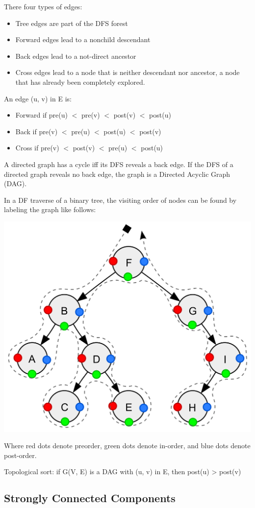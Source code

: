\begin{definition}
There four types of edges:
\begin{itemize}
	\item Tree edges are part of the DFS forest
	\item Forward edges lead to a nonchild descendant
	\item Back edges lead to a not-direct ancestor
	\item Cross edges lead to a node that is neither descendant nor ancestor, a node that has already been completely explored.
\end{itemize}
An edge (u, v) in E is:
\begin{itemize}
	\item Forward if pre(u) $<$ pre(v) $<$ post(v) $<$ post(u)
	\item Back if pre(v) $<$ pre(u) $<$ post(u) $<$ post(v)
	\item Cross if pre(v) $<$ post(v) $<$ pre(u) $<$ post(u)
\end{itemize}
\end{definition}

\begin{definition}
	A directed graph has a cycle iff its DFS reveals a back edge. If the DFS of a directed graph reveals no back edge, the graph is a Directed Acyclic Graph (DAG).
\end{definition}

\begin{remark}
	In a DF traverse of a binary tree, the visiting order of nodes can be found by labeling the graph like follows: \\
	\begin{center}
		\includegraphics[scale=0.2]{images/dfs_order.png} \\
	\end{center}
	Where red dots denote preorder, green dots denote in-order, and blue dots denote post-order.
\end{remark}

\begin{remark}
	Topological sort: if G(V, E) is a DAG with (u, v) in E, then post(u) > post(v)
\end{remark}

\subsection{Strongly Connected Components}